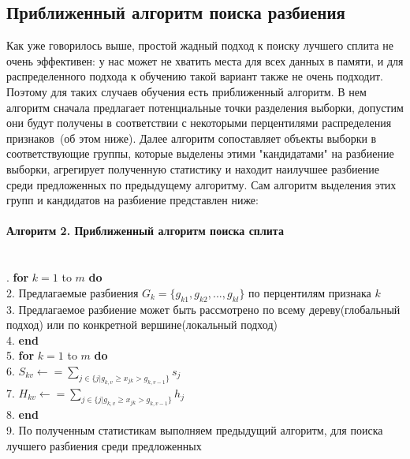 \documentclass[12pt,fleqn]{article}
\begin{document}
\subsection{Приближенный алгоритм поиска разбиения}
Как уже говорилось выше, простой жадный подход к поиску лучшего сплита не очень эффективен: у нас может не хватить места для всех данных в памяти, и для распределенного подхода к обучению такой вариант также не очень подходит. Поэтому для таких случаев обучения есть приближенный алгоритм. В нем алгоритм сначала предлагает потенциальные точки разделения выборки, допустим они будут получены в соответствии с некоторыми перцентилями распределения признаков~(об этом ниже). Далее алгоритм сопоставляет объекты выборки в соответствующие группы, которые выделены этими "кандидатами" на разбиение выборки, агрегирует полученную статистику и находит наилучшее разбиение среди предложенных по предыдущему алгоритму. Сам алгоритм выделения этих групп и кандидатов на разбиение представлен ниже:
\newpage
\vspace{5pt}
\noindent
\hline\\
\hline\\ \vspace{5pt}
\textbf{Алгоритм 2. Приближенный алгоритм поиска сплита}\\
\hline\\ \vspace{10pt}
\hline\\ \vspace{10pt}
{\ttfamily
	. \textbf{for} $k = 1$ to $m$ \textbf{do}\\
	2. \hspace{15pt} Предлагаемые разбиения $G_k=\{g_{k1},g_{k2},...,g_{kl}\}$ по перцентилям признака $k$\\
	3. \hspace{15pt} Предлагаемое разбиение может быть рассмотрено по всему дереву(глобальный подход) или по конкретной вершине(локальный подход)\\
	4. \textbf{end}\\
	5. \textbf{for} $k = 1$ to $m$ \textbf{do}\\
	6. \hspace{15pt} $S_{kv} \leftarrow=\sum_{j \in \{j|g_{k,v} \geq x_{jk} > g_{k,v-1}\}}s_j$\\
	7. \hspace{15pt} $H_{kv} \leftarrow= \sum_{j \in \{j|g_{k,v}\geq x_{jk} > g_{k,v-1}\}}h_j$\\
	8. \textbf{end}\\
	9. По полученным статистикам выполняем предыдущий алгоритм, для поиска лучшего разбиения среди предложенных
}
\end{document}
